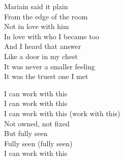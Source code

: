 \begin{lyrics}
Mariain said it plain\\
From the edge of the room\\
Not in love with him\\
In love with who I became too\\
And I heard that answer\\
Like a door in my chest\\
It was never a smaller feeling\\
It was the truest one I met

I can work with this\\
I can work with this\\
I can work with this (work with this)\\
Not owned, not fixed\\
But fully seen\\
Fully seen (fully seen)\\
I can work with this
\end{lyrics}

